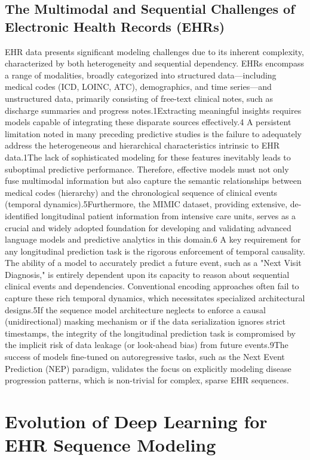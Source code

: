 \subsection{The Multimodal and Sequential Challenges of Electronic Health Records (EHRs)}
EHR data presents significant modeling challenges due to its inherent complexity, characterized by both heterogeneity and sequential dependency. EHRs encompass a range of modalities, broadly categorized into structured data—including medical codes (ICD, LOINC, ATC), demographics, and time series—and unstructured data, primarily consisting of free-text clinical notes, such as discharge summaries and progress notes.1Extracting meaningful insights requires models capable of integrating these disparate sources effectively.4
A persistent limitation noted in many preceding predictive studies is the failure to adequately address the heterogeneous and hierarchical characteristics intrinsic to EHR data.1The lack of sophisticated modeling for these features inevitably leads to suboptimal predictive performance. Therefore, effective models must not only fuse multimodal information but also capture the semantic relationships between medical codes (hierarchy) and the chronological sequence of clinical events (temporal dynamics).5Furthermore, the MIMIC dataset, providing extensive, de-identified longitudinal patient information from intensive care units, serves as a crucial and widely adopted foundation for developing and validating advanced language models and predictive analytics in this domain.6
A key requirement for any longitudinal prediction task is the rigorous enforcement of temporal causality. The ability of a model to accurately predict a future event, such as a "Next Visit Diagnosis," is entirely dependent upon its capacity to reason about sequential clinical events and dependencies. Conventional encoding approaches often fail to capture these rich temporal dynamics, which necessitates specialized architectural designs.5If the sequence model architecture neglects to enforce a causal (unidirectional) masking mechanism or if the data serialization ignores strict timestamps, the integrity of the longitudinal prediction task is compromised by the implicit risk of data leakage (or look-ahead bias) from future events.9The success of models fine-tuned on autoregressive tasks, such as the Next Event Prediction (NEP) paradigm, validates the focus on explicitly modeling disease progression patterns, which is non-trivial for complex, sparse EHR sequences.


\section{Evolution of Deep Learning for EHR Sequence Modeling}
